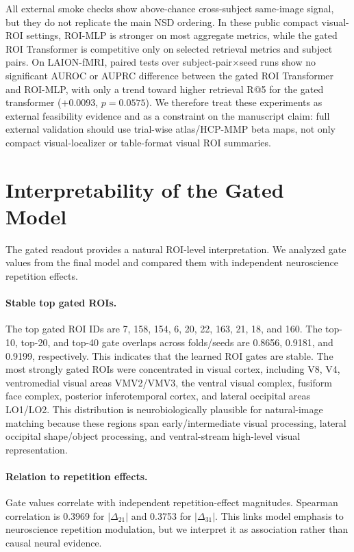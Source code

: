 \documentclass{article}
\begin{document}
All external smoke checks show above-chance cross-subject same-image signal, but they do not replicate the main NSD ordering. In these public compact visual-ROI settings, ROI-MLP is stronger on most aggregate metrics, while the gated ROI Transformer is competitive only on selected retrieval metrics and subject pairs. On LAION-fMRI, paired tests over subject-pair$\times$seed runs show no significant AUROC or AUPRC difference between the gated ROI Transformer and ROI-MLP, with only a trend toward higher retrieval R@5 for the gated transformer ($+0.0093$, $p=0.0575$). We therefore treat these experiments as external feasibility evidence and as a constraint on the manuscript claim: full external validation should use trial-wise atlas/HCP-MMP beta maps, not only compact visual-localizer or table-format visual ROI summaries.

\section{Interpretability of the Gated Model}

The gated readout provides a natural ROI-level interpretation. We analyzed gate values from the final model and compared them with independent neuroscience repetition effects.

\paragraph{Stable top gated ROIs.}
The top gated ROI IDs are 7, 158, 154, 6, 20, 22, 163, 21, 18, and 160. The top-10, top-20, and top-40 gate overlaps across folds/seeds are 0.8656, 0.9181, and 0.9199, respectively. This indicates that the learned ROI gates are stable. The most strongly gated ROIs were concentrated in visual cortex, including V8, V4, ventromedial visual areas VMV2/VMV3, the ventral visual complex, fusiform face complex, posterior inferotemporal cortex, and lateral occipital areas LO1/LO2. This distribution is neurobiologically plausible for natural-image matching because these regions span early/intermediate visual processing, lateral occipital shape/object processing, and ventral-stream high-level visual representation.

\paragraph{Relation to repetition effects.}
Gate values correlate with independent repetition-effect magnitudes. Spearman correlation is 0.3969 for $|\Delta_{21}|$ and 0.3753 for $|\Delta_{31}|$. This links model emphasis to neuroscience repetition modulation, but we interpret it as association rather than causal neural evidence.
\end{document}
